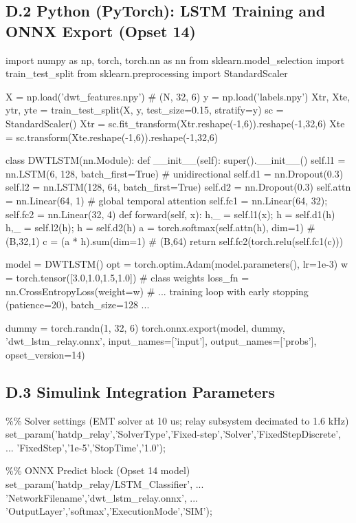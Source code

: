 \subsection{D.2  Python (PyTorch): LSTM Training and ONNX Export (Opset 14)}
import numpy as np, torch, torch.nn as nn
from sklearn.model\_selection import train\_test\_split
from sklearn.preprocessing import StandardScaler

X = np.load('dwt\_features.npy')   \# (N, 32, 6)
y = np.load('labels.npy')
Xtr, Xte, ytr, yte = train\_test\_split(X, y, test\_size=0.15, stratify=y)
sc = StandardScaler()
Xtr = sc.fit\_transform(Xtr.reshape(-1,6)).reshape(-1,32,6)
Xte = sc.transform(Xte.reshape(-1,6)).reshape(-1,32,6)

class DWTLSTM(nn.Module):
    def \_\_init\_\_(self):
        super().\_\_init\_\_()
        self.l1 = nn.LSTM(6, 128, batch\_first=True)      \# unidirectional
        self.d1 = nn.Dropout(0.3)
        self.l2 = nn.LSTM(128, 64, batch\_first=True)
        self.d2 = nn.Dropout(0.3)
        self.attn = nn.Linear(64, 1)                     \# global temporal attention
        self.fc1 = nn.Linear(64, 32); self.fc2 = nn.Linear(32, 4)
    def forward(self, x):
        h,\_ = self.l1(x); h = self.d1(h)
        h,\_ = self.l2(h); h = self.d2(h)
        a = torch.softmax(self.attn(h), dim=1)           \# (B,32,1)
        c = (a * h).sum(dim=1)                            \# (B,64)
        return self.fc2(torch.relu(self.fc1(c)))

model = DWTLSTM()
opt = torch.optim.Adam(model.parameters(), lr=1e-3)
w = torch.tensor([3.0,1.0,1.5,1.0])                       \# class weights
loss\_fn = nn.CrossEntropyLoss(weight=w)
\# ... training loop with early stopping (patience=20), batch\_size=128 ...

dummy = torch.randn(1, 32, 6)
torch.onnx.export(model, dummy, 'dwt\_lstm\_relay.onnx',
                  input\_names=['input'], output\_names=['probs'],
                  opset\_version=14)


\subsection{D.3  Simulink Integration Parameters}
\%\% Solver settings (EMT solver at 10 us; relay subsystem decimated to 1.6 kHz)
set\_param('hatdp\_relay','SolverType','Fixed-step','Solver','FixedStepDiscrete', ...
          'FixedStep','1e-5','StopTime','1.0');

\%\% ONNX Predict block (Opset 14 model)
set\_param('hatdp\_relay/LSTM\_Classifier', ...
          'NetworkFilename','dwt\_lstm\_relay.onnx', ...
          'OutputLayer','softmax','ExecutionMode','SIM');

